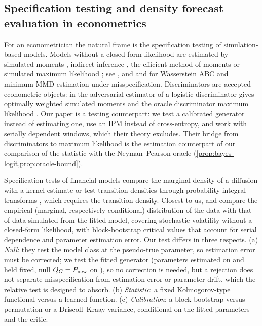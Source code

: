 \subsection{Specification testing and density forecast evaluation in econometrics}
\label{sec:lit-econometrics}

For an econometrician the natural frame is the specification testing of simulation-based models.
Models without a closed-form likelihood are estimated by simulated moments
\citep{mcfadden1989method,duffie1993simulated}, indirect inference
\citep{gourieroux1993indirect,smith1993estimating}, the efficient method of moments
\citep{gallant1996which} or simulated maximum likelihood \citep{fermanian2004nonparametric}; see
\citet{gourieroux1997simulation}, and \citet{bernton2019approximate} and \citet{cherief2022finite}
for Wasserstein ABC and minimum-MMD estimation under misspecification. Discriminators are accepted econometric objects: in the
adversarial estimator of \citet{kaji2023adversarial} a logistic discriminator gives optimally
weighted simulated moments and the oracle discriminator maximum likelihood \citep[see
also][]{kaji2023metropolis}. Our paper is a testing counterpart: we test a calibrated generator
instead of estimating one, use an IPM instead of cross-entropy, and work with serially dependent
windows, which their theory excludes. Their bridge from discriminators to maximum likelihood is the
estimation counterpart of our comparison of the \LRC{} statistic with the Neyman--Pearson oracle
(\cref{prop:bayes-logit,prop:oracle-bound}).

Specification tests of financial models compare the marginal density of a diffusion with a kernel
estimate \citep{aitsahalia1996testing} or test transition densities through probability integral
transforms \citep{hong2005nonparametric}, which requires the transition density. Closest to us,
\citet{corradi2005bootstrap} and \citet{bhardwaj2008simulation} compare the empirical (marginal,
respectively conditional) distribution of the data with that of data simulated from the fitted
model, covering stochastic volatility without a closed-form likelihood, with block-bootstrap
critical values that account for serial dependence and parameter estimation error. Our test
differs in three respects. (a) \emph{Null}: they test the model class at the pseudo-true
parameter, so estimation error must be corrected; we test the fitted generator (parameters
estimated on \TRAIN{} and held fixed, null $Q_{G}=P_{\mathrm{new}}$ on \TEST{}), so no correction is needed,
but a rejection does not separate misspecification from estimation error or parameter drift, which
the relative test is designed to absorb. (b) \emph{Statistic}: a fixed Kolmogorov-type functional
versus a learned function. (c) \emph{Calibration}: a block bootstrap versus permutation or a
Driscoll--Kraay variance, conditional on the fitted parameters and the critic.

